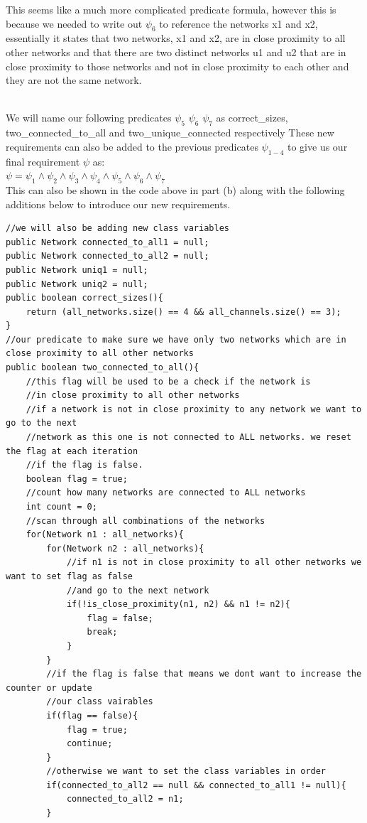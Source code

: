 \documentclass{article}
\begin{document}
\begin{enumerate}[(a)]
\begin{enumerate}[(1)]
            This seems like a much more complicated predicate formula, however this is because we needed to write out $\psi_6$ to reference the networks x1 and x2, essentially it states that two networks, x1 and x2, are in close proximity to all other networks and that there are two distinct networks u1 and u2 that are in close proximity to those networks and not in close proximity to each other and they are not the same network.
        \end{enumerate}
        \\We will name our following predicates $\psi_5$ $\psi_6$ $\psi_7$ as correct\_sizes, two\_connected\_to\_all and two\_unique\_connected respectively
        These new requirements can also be added to the previous predicates $\psi_{1-4}$ to give us our final requirement $\psi$ as:\\
        $\psi = \psi_1 \land \psi_2 \land \psi_3 \land \psi_4 \land \psi_5 \land \psi_6 \land \psi_7$\\
        This can also be shown in the code above in part (b) along with the following additions below to introduce our new requirements.
        \begin{lstlisting}
//we will also be adding new class variables
public Network connected_to_all1 = null;
public Network connected_to_all2 = null;
public Network uniq1 = null;
public Network uniq2 = null;
public boolean correct_sizes(){
    return (all_networks.size() == 4 && all_channels.size() == 3);
}
//our predicate to make sure we have only two networks which are in close proximity to all other networks
public boolean two_connected_to_all(){
    //this flag will be used to be a check if the network is
    //in close proximity to all other networks
    //if a network is not in close proximity to any network we want to go to the next
    //network as this one is not connected to ALL networks. we reset the flag at each iteration
    //if the flag is false.
    boolean flag = true;
    //count how many networks are connected to ALL networks
    int count = 0;
    //scan through all combinations of the networks
    for(Network n1 : all_networks){
        for(Network n2 : all_networks){
            //if n1 is not in close proximity to all other networks we want to set flag as false
            //and go to the next network
            if(!is_close_proximity(n1, n2) && n1 != n2){
                flag = false;
                break;
            }
        }
        //if the flag is false that means we dont want to increase the counter or update
        //our class vairables
        if(flag == false){
            flag = true;
            continue;
        }
        //otherwise we want to set the class variables in order
        if(connected_to_all2 == null && connected_to_all1 != null){
            connected_to_all2 = n1;
        }


\end{lstlisting}
\end{enumerate}
\end{document}
